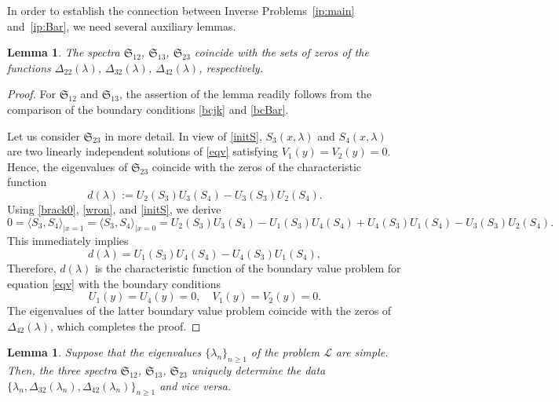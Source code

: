 \documentclass[a4paper,12pt]{article}
\newcommand{\la}{\lambda}
\theoremstyle{plain}
\numberwithin{equation}{section}
\newtheorem{lem}[thm]{Lemma}
\theoremstyle{definition}
\theoremstyle{remark}
\begin{document}
In order to establish the connection between Inverse Problems~\ref{ip:main} and~\ref{ip:Bar}, we need several auxiliary lemmas.

\begin{lem} \label{lem:scf}
The spectra $\mathfrak S_{12}$, $\mathfrak S_{13}$, $\mathfrak S_{23}$ coincide with the sets of zeros of the functions $\Delta_{22}(\la)$, $\Delta_{32}(\la)$, $\Delta_{42}(\la)$, respectively.
\end{lem}

\begin{proof}
For $\mathfrak S_{12}$ and $\mathfrak S_{13}$, the assertion of the lemma readily follows from the comparison of the boundary conditions \eqref{bcjk} and \eqref{bcBar}.

Let us consider $\mathfrak S_{23}$ in more detail. In view of \eqref{initS}, $S_3(x, \la)$ and $S_4(x, \la)$ are two linearly independent solutions of \eqref{eqv} satisfying $V_1(y) = V_2(y) = 0$. Hence, the eigenvalues of $\mathfrak S_{23}$ coincide with the zeros of the characteristic function
$$
d(\la) := U_2(S_3) U_3(S_4) - U_3(S_3) U_2(S_4).
$$
Using \eqref{brack0}, \eqref{wron}, and \eqref{initS}, we derive
$$
0 = \langle S_3, S_4 \rangle_{|x = 1} = \langle S_3, S_4 \rangle_{|x = 0} = U_2(S_3) U_3(S_4) - U_1(S_3) U_4(S_4) + U_4(S_3) U_1(S_4) - U_3(S_3) U_2(S_4).
$$
This immediately implies
$$
d(\la) = U_1(S_3) U_4(S_4) - U_4(S_3) U_1(S_4),
$$
Therefore, $d(\la)$ is the characteristic function of the boundary value problem for equation \eqref{eqv} with the boundary conditions
$$
U_1(y) = U_4(y) = 0, \quad V_1(y) = V_2(y) = 0.
$$
The eigenvalues of the latter boundary value problem coincide with the zeros of $\Delta_{42}(\la)$, which completes the proof.
\end{proof}

\begin{lem} \label{lem:equivB}
Suppose that the eigenvalues $\{ \la_n \}_{n \ge 1}$ of the problem $\mathcal L$ are simple.
Then, the three spectra $\mathfrak S_{12}$, $\mathfrak S_{13}$, $\mathfrak S_{23}$ uniquely determine the data $\{ \la_n, \Delta_{32}(\la_n), \Delta_{42}(\la_n) \}_{n \ge 1}$ and vice versa.
\end{lem}
\end{document}
